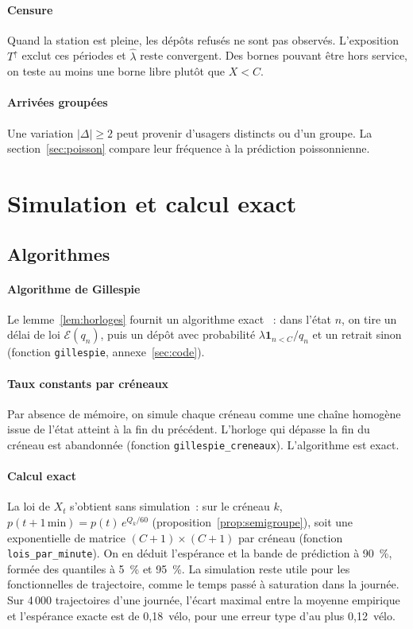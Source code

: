 \documentclass[10pt,a4paper,twocolumn]{article}
\theoremstyle{enonce}
\theoremstyle{defi}
\newcommand{\un}{\mathbf{1}}
\newcommand{\Tu}{T^{\uparrow}}
\begin{document}
\paragraph{Censure} Quand la station est pleine, les dépôts refusés ne sont pas observés. L'exposition $\Tu$ exclut ces périodes et $\hat\lambda$ reste convergent. Des bornes pouvant être hors service, on teste \og au moins une borne libre\fg{} plutôt que $X<C$.

\paragraph{Arrivées groupées} Une variation $|\Delta|\geq2$ peut provenir d'usagers distincts ou d'un groupe. La section~\ref{sec:poisson} compare leur fréquence à la prédiction poissonnienne.

\section{Simulation et calcul exact}\label{sec:simulation}

\subsection{Algorithmes}

\paragraph{Algorithme de Gillespie} Le lemme~\ref{lem:horloges} fournit un algorithme exact \cite{Gil77}~: dans l'état $n$, on tire un délai de loi $\mathcal{E}(q_n)$, puis un dépôt avec probabilité $\lambda\un_{n<C}/q_n$ et un retrait sinon (fonction \texttt{gillespie}, annexe~\ref{sec:code}).

\paragraph{Taux constants par créneaux} Par absence de mémoire, on simule chaque créneau comme une chaîne homogène issue de l'état atteint à la fin du précédent. L'horloge qui dépasse la fin du créneau est abandonnée (fonction \texttt{gillespie\_creneaux}). L'algorithme est exact.

\paragraph{Calcul exact} La loi de $X_t$ s'obtient sans simulation~: sur le créneau $k$, $p(t+1\,\mathrm{min})=p(t)\,e^{Q_k/60}$ (proposition~\ref{prop:semigroupe}), soit une exponentielle de matrice $(C+1)\times(C+1)$ par créneau (fonction \texttt{lois\_par\_minute}). On en déduit l'espérance et la bande de prédiction à 90~\%, formée des quantiles à 5~\% et 95~\%. La simulation reste utile pour les fonctionnelles de trajectoire, comme le temps passé à saturation dans la journée. Sur 4\,000 trajectoires d'une journée, l'écart maximal entre la moyenne empirique et l'espérance exacte est de 0{,}18~vélo, pour une erreur type d'au plus 0{,}12~vélo.
\end{document}
